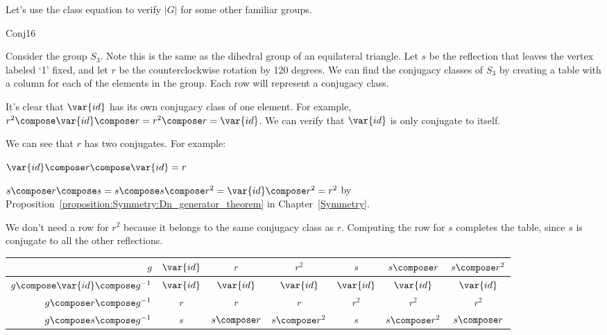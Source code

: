 Let's use the class equation to verify $|G|$ for some other familiar groups.  

\begin{example}{Conj16}

Consider the group $S_3$.  Note this is the same as the dihedral group of an equilateral triangle.  
Let $s$ be the reflection that leaves the vertex labeled `1' fixed, and let $r$ be the counterclockwise rotation by 120 degrees.  We can find the conjugacy classes of $S_3$ by creating a table with a column for each of the elements in the group.  Each row will represent a conjugacy class.  

It's clear that $\var{id}$ has its own conjugacy class of one element.  For example, 
$r^2\compose \var{id} \compose r=r^2\compose r=\var{id}$. We can verify that $\var{id}$ is only conjugate to itself.

 We can see that $r$ has two conjugates.  For example:

 $\var{id}\compose r \compose \var{id}=r$ 

$s\compose r \compose s=s\compose s\compose r^2=\var{id}\compose r^2=r^2$
by Proposition~\ref{proposition:Symmetry:Dn_generator_theorem}  in Chapter~\ref{Symmetry}.  

%


We don't need a row for $r^2$ because it belongs to the same conjugacy class as $r$.  
Computing the row for $s$ completes the table, since $s$ is conjugate to all the other reflections.

\begin{center}
\begin{tabular}{|r | c | c |c | c | c |c |}\hline
$g$ &$\var{id}$ & $r$ &$r^2$ &$ s$ &$ s\compose r$ & $s\compose r ^2$\\ \hline
$g\compose \var{id}\compose g^{-1}$ & $\var{id}$ & $\var{id}$ & $\var{id}$ &$\var{id}$ &$\var{id}$ &$\var{id}$ \\ \hline
$ g\compose r\compose g^{-1}$& $r$&$ r$& $r$&$r^2$ &$r^2$ & $r^2$\\ \hline
$g\compose s\compose g^{-1}$ & $s$ &$ s\compose r$ & $s\compose r^2$ & $s$ & $s\compose r^2$ & $s\compose r$\\ \hline 
\end{tabular}
\end{center}


\end{example}
